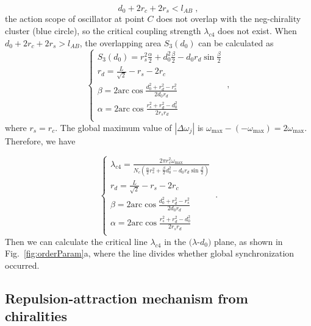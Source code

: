 \documentclass[%
 aip,
 amsmath,amssymb,
 reprint,%
]{revtex4-1}
\begin{document}
\begin{equation}
    d_0+2r_c+2r_s<l_{AB}\;,
\end{equation}
the action scope of oscillator at point $C$ does not overlap with the neg-chirality cluster (blue circle), so the critical coupling strength $\lambda_{c4}$ does not exist. When $d_0+2r_c+2r_s>l_{AB}$, the overlapping area $S_3\left( d_0 \right)$ can be calculated as
\begin{equation}
    \begin{cases}
        S_3\left( d_0 \right) =r_{s}^{2}\frac{\alpha}{2}+d_{0}^{2}\frac{\beta}{2}-d_0r_d\sin \frac{\beta}{2}\\
        r_d=\frac{L}{\sqrt{2}}-r_s-2r_c\\
        \beta =2\mathrm{arc}\cos \frac{d_{0}^{2}+r_{d}^{2}-r_{s}^{2}}{2d_0r_d}\\
        \alpha =2\mathrm{arc}\cos \frac{r_{s}^{2}+r_{d}^{2}-d_{0}^{2}}{2r_sr_d}\\
    \end{cases}\;,
\end{equation}
where $r_s=r_c$. The global maximum value of $\left| \Delta \omega _j \right|$ is $\omega _{\max}-\left( -\omega _{\max} \right) =2\omega _{\max}$. Therefore, we have

\begin{equation}
    \begin{cases}
        \lambda _{c4}=\frac{2\pi r_{s}^{2}\omega _{\max}}{N_c\left( \frac{\alpha}{2}r_{s}^{2}+\frac{\beta}{2}d_{0}^{2}-d_0r_d\sin \frac{\beta}{2} \right)}\\
        r_d=\frac{L}{\sqrt{2}}-r_s-2r_c\\
        \beta =2\mathrm{arc}\cos \frac{d_{0}^{2}+r_{d}^{2}-r_{s}^{2}}{2d_0r_d}\\
        \alpha =2\mathrm{arc}\cos \frac{r_{s}^{2}+r_{d}^{2}-d_{0}^{2}}{2r_sr_d}\\
    \end{cases}\;.
\end{equation}
Then we can calculate the critical line $\lambda_{c4}$ in the $(\lambda$-$d_0)$ plane, as shown in Fig.~\ref{fig:orderParam}a, where the line divides whether global synchronization occurred.

\subsection{Repulsion-attraction mechanism from chiralities}
\end{document}

